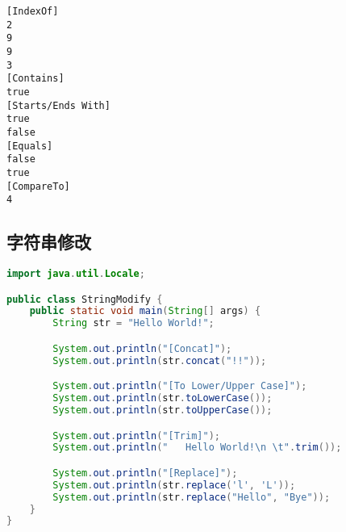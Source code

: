 \begin{tcolorbox}
	\begin{verbatim}
[IndexOf]
2
9
9
3
[Contains]
true
[Starts/Ends With]
true
false
[Equals]
false
true
[CompareTo]
4
	\end{verbatim}
\end{tcolorbox}

\vspace{0.5cm}

\subsection{字符串修改}

\begin{table}[H]
	\centering
\end{table}

\vspace{0.5cm}


\begin{lstlisting}[language=Java]
import java.util.Locale;

public class StringModify {
	public static void main(String[] args) {
		String str = "Hello World!";

		System.out.println("[Concat]");
		System.out.println(str.concat("!!"));

		System.out.println("[To Lower/Upper Case]");
		System.out.println(str.toLowerCase());
		System.out.println(str.toUpperCase());

		System.out.println("[Trim]");
		System.out.println("   Hello World!\n \t".trim());

		System.out.println("[Replace]");
		System.out.println(str.replace('l', 'L'));
		System.out.println(str.replace("Hello", "Bye"));
	}
}	
\end{lstlisting}

